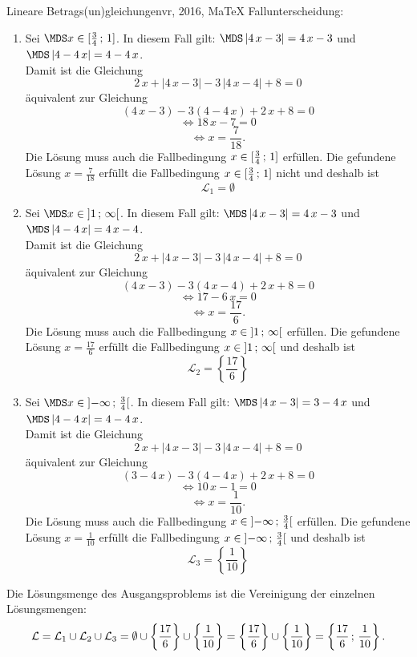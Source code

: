 \begin{MAufgabe}{Lineare Betrags(un)gleichungen}{vr, 2016, MaTeX}
 Fallunterscheidung: 

 \begin{enumerate} 
 \item Sei $ \MDS x\in[ \frac{3}{4} \, \MIntvlSep \, 1]$. 
 In diesem Fall gilt: 
  $ \MDS \left| 4\, x - 3\right|=4\, x - 3$ und $ \MDS \left| 4 - 4\, x\right|=4 - 4\, x$. \\ 
 Damit ist die Gleichung 
 $$ 
2\, x + \left|4\, x - 3\right| - 3\, \left|4\, x - 4\right| + 8= 0
$$
 \"aquivalent zur Gleichung
 $$ 
\left(4\, x - 3\right)-3\left( 4 - 4\, x\right)+2\, x+8= 0 
$$  
$$ 
 \Leftrightarrow 18\, x - 7= 0 
$$  
$$ \Leftrightarrow x = \frac{7}{18} . 
 $$ 
 Die L\"osung muss auch die Fallbedingung $x\in [ \frac{3}{4} \, ; \, 1] $ erf\"ullen. Die gefundene L\"osung $x=\frac{7}{18}$ erf\"ullt die Fallbedingung  $x\in [ \frac{3}{4} \, ; \, 1]$ nicht und deshalb ist  $$
 \mathcal{L}_{1}=\emptyset 
 $$ 
\item Sei $ \MDS x\in\MoIl  1 \, \MIntvlSep \, \infty\MoIr $. 
 In diesem Fall gilt: 
  $ \MDS \left| 4\, x - 3\right|=4\, x - 3$ und $ \MDS \left| 4 - 4\, x\right|=4\, x - 4$. \\ 
 Damit ist die Gleichung 
 $$ 
2\, x + \left|4\, x - 3\right| - 3\, \left|4\, x - 4\right| + 8= 0
$$
 \"aquivalent zur Gleichung
 $$ 
\left(4\, x - 3\right)-3\left( 4\, x - 4\right)+2\, x+8= 0 
$$  
$$ 
 \Leftrightarrow 17 - 6\, x= 0 
$$  
$$ \Leftrightarrow x = \frac{17}{6} . 
 $$ 
 Die L\"osung muss auch die Fallbedingung $x\in \mbox{}]\mathopen{}  1 \, ; \, \infty[\mbox{}  $ erf\"ullen. Die gefundene L\"osung $x=\frac{17}{6}$ erf\"ullt die Fallbedingung  $x\in \mbox{}]\mathopen{}  1 \, ; \, \infty[\mbox{} $ und deshalb ist  $$
 \mathcal{L}_{2}=\left\{\frac{17}{6}\right\}
 $$ 
\item Sei $ \MDS x\in\MoIl  -\infty \, \MIntvlSep \, \frac{3}{4}\MoIr $. 
 In diesem Fall gilt: 
  $ \MDS \left| 4\, x - 3\right|=3 - 4\, x$ und $ \MDS \left| 4 - 4\, x\right|=4 - 4\, x$. \\ 
 Damit ist die Gleichung 
 $$ 
2\, x + \left|4\, x - 3\right| - 3\, \left|4\, x - 4\right| + 8= 0
$$
 \"aquivalent zur Gleichung
 $$ 
\left(3 - 4\, x\right)-3\left( 4 - 4\, x\right)+2\, x+8= 0 
$$  
$$ 
 \Leftrightarrow 10\, x - 1= 0 
$$  
$$ \Leftrightarrow x = \frac{1}{10} . 
 $$ 
 Die L\"osung muss auch die Fallbedingung $x\in \mbox{}]\mathopen{}  -\infty \, ; \, \frac{3}{4}[\mbox{}  $ erf\"ullen. Die gefundene L\"osung $x=\frac{1}{10}$ erf\"ullt die Fallbedingung  $x\in \mbox{}]\mathopen{}  -\infty \, ; \, \frac{3}{4}[\mbox{} $ und deshalb ist  $$
 \mathcal{L}_{3}=\left\{\frac{1}{10}\right\}
 $$ 
 \end{enumerate} 
  Die L\"osungsmenge des Ausgangsproblems ist die Vereinigung der einzelnen L\"osungsmengen: 
$$ \mathcal{L} = \mathcal{L}_{1} \cup \mathcal{L}_{2} \cup \mathcal{L}_{3} 
 = \emptyset\cup \left\{\frac{17}{6}\right\}\cup \left\{\frac{1}{10}\right\} 
  =\left\{\frac{17}{6}\right\}\cup\left\{\frac{1}{10}\right\} 
  = \left\{\frac{17}{6}\, ; \,\frac{1}{10}\right\} 
 . $$ 
 

\end{MAufgabe}
